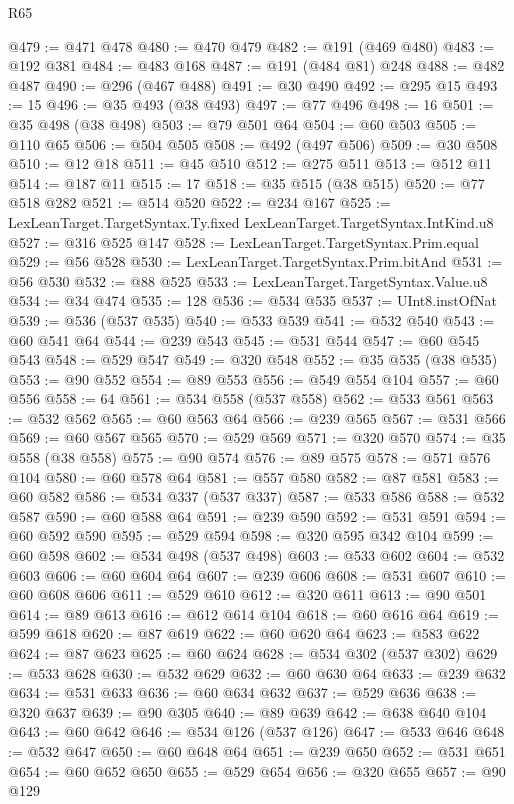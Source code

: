 \begin{lexlean}{R65}
\begin{coremodule}
@479 := @471 @478
@480 := @470 @479
@482 := @191 (@469 @480)
@483 := @192 @381
@484 := @483 @168
@487 := @191 (@484 @81) @248
@488 := @482 @487
@490 := @296 (@467 @488)
@491 := @30 @490
@492 := @295 @15
@493 := 15
@496 := @35 @493 (@38 @493)
@497 := @77 @496
@498 := 16
@501 := @35 @498 (@38 @498)
@503 := @79 @501 @64
@504 := @60 @503
@505 := @110 @65
@506 := @504 @505
@508 := @492 (@497 @506)
@509 := @30 @508
@510 := @12 @18
@511 := @45 @510
@512 := @275 @511
@513 := @512 @11
@514 := @187 @11
@515 := 17
@518 := @35 @515 (@38 @515)
@520 := @77 @518 @282
@521 := @514 @520
@522 := @234 @167
@525 := LexLeanTarget.TargetSyntax.Ty.fixed LexLeanTarget.TargetSyntax.IntKind.u8
@527 := @316 @525 @147
@528 := LexLeanTarget.TargetSyntax.Prim.equal
@529 := @56 @528
@530 := LexLeanTarget.TargetSyntax.Prim.bitAnd
@531 := @56 @530
@532 := @88 @525
@533 := LexLeanTarget.TargetSyntax.Value.u8
@534 := @34 @474
@535 := 128
@536 := @534 @535
@537 := UInt8.instOfNat
@539 := @536 (@537 @535)
@540 := @533 @539
@541 := @532 @540
@543 := @60 @541 @64
@544 := @239 @543
@545 := @531 @544
@547 := @60 @545 @543
@548 := @529 @547
@549 := @320 @548
@552 := @35 @535 (@38 @535)
@553 := @90 @552
@554 := @89 @553
@556 := @549 @554 @104
@557 := @60 @556
@558 := 64
@561 := @534 @558 (@537 @558)
@562 := @533 @561
@563 := @532 @562
@565 := @60 @563 @64
@566 := @239 @565
@567 := @531 @566
@569 := @60 @567 @565
@570 := @529 @569
@571 := @320 @570
@574 := @35 @558 (@38 @558)
@575 := @90 @574
@576 := @89 @575
@578 := @571 @576 @104
@580 := @60 @578 @64
@581 := @557 @580
@582 := @87 @581
@583 := @60 @582
@586 := @534 @337 (@537 @337)
@587 := @533 @586
@588 := @532 @587
@590 := @60 @588 @64
@591 := @239 @590
@592 := @531 @591
@594 := @60 @592 @590
@595 := @529 @594
@598 := @320 @595 @342 @104
@599 := @60 @598
@602 := @534 @498 (@537 @498)
@603 := @533 @602
@604 := @532 @603
@606 := @60 @604 @64
@607 := @239 @606
@608 := @531 @607
@610 := @60 @608 @606
@611 := @529 @610
@612 := @320 @611
@613 := @90 @501
@614 := @89 @613
@616 := @612 @614 @104
@618 := @60 @616 @64
@619 := @599 @618
@620 := @87 @619
@622 := @60 @620 @64
@623 := @583 @622
@624 := @87 @623
@625 := @60 @624
@628 := @534 @302 (@537 @302)
@629 := @533 @628
@630 := @532 @629
@632 := @60 @630 @64
@633 := @239 @632
@634 := @531 @633
@636 := @60 @634 @632
@637 := @529 @636
@638 := @320 @637
@639 := @90 @305
@640 := @89 @639
@642 := @638 @640 @104
@643 := @60 @642
@646 := @534 @126 (@537 @126)
@647 := @533 @646
@648 := @532 @647
@650 := @60 @648 @64
@651 := @239 @650
@652 := @531 @651
@654 := @60 @652 @650
@655 := @529 @654
@656 := @320 @655
@657 := @90 @129

\end{coremodule}
\end{lexlean}
